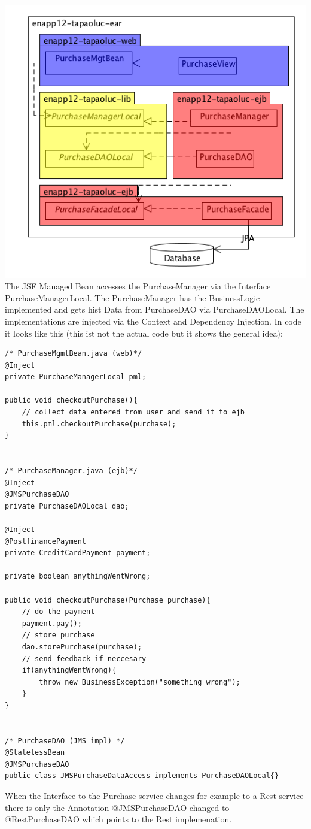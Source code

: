 \documentclass[11pt]{amsart}
\begin{document}
\includegraphics[scale=0.8]{sample-arch.png}\\
The JSF Managed Bean accesses the PurchaseManager via the Interface PurchaseManagerLocal. The PurchaseManager has the BusinessLogic implemented and gets hist Data from PurchaseDAO via PurchaseDAOLocal. The implementations are injected via the Context and Dependency Injection. 
\newpage{}
In code it looks like this (this ist not the actual code but it shows the general idea):\\
\begin{lstlisting}
/* PurchaseMgmtBean.java (web)*/
@Inject
private PurchaseManagerLocal pml;

public void checkoutPurchase(){
	// collect data entered from user and send it to ejb
	this.pml.checkoutPurchase(purchase);
}


/* PurchaseManager.java (ejb)*/
@Inject
@JMSPurchaseDAO
private PurchaseDAOLocal dao;

@Inject
@PostfinancePayment
private CreditCardPayment payment;

private boolean anythingWentWrong;

public void checkoutPurchase(Purchase purchase){
	// do the payment
	payment.pay();
	// store purchase
	dao.storePurchase(purchase);
	// send feedback if neccesary
	if(anythingWentWrong){
		throw new BusinessException("something wrong");
	}
}


/* PurchaseDAO (JMS impl) */
@StatelessBean
@JMSPurchaseDAO
public class JMSPurchaseDataAccess implements PurchaseDAOLocal{}
\end{lstlisting}
%
When the Interface to the Purchase service changes for example to a Rest service there is only the Annotation \textsf{@JMSPurchaseDAO} changed to \textsf{@RestPurchaseDAO} which points to the Rest implemenation.
\end{document}
